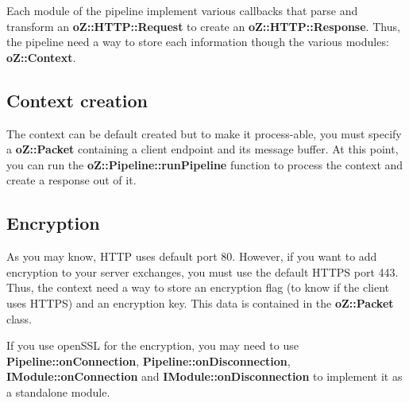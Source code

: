Each module of the pipeline implement various callbacks that parse and transform an {\bfseries{o\+Z\+::\+H\+T\+T\+P\+::\+Request}} to create an {\bfseries{o\+Z\+::\+H\+T\+T\+P\+::\+Response}}. Thus, the pipeline need a way to store each information though the various modules\+: {\bfseries{o\+Z\+::\+Context}}.

\subsection*{Context creation}

The context can be default created but to make it process-\/able, you must specify a {\bfseries{o\+Z\+::\+Packet}} containing a client endpoint and its message buffer. At this point, you can run the {\bfseries{o\+Z\+::\+Pipeline\+::run\+Pipeline}} function to process the context and create a response out of it. 
\begin{DoxyCode}{0}
\DoxyCodeLine{\{}
\DoxyCodeLine{}
\DoxyCodeLine{\}}
\end{DoxyCode}


\subsection*{Encryption}

As you may know, H\+T\+TP uses default port 80. However, if you want to add encryption to your server exchanges, you must use the default H\+T\+T\+PS port 443. Thus, the context need a way to store an encryption flag (to know if the client uses H\+T\+T\+PS) and an encryption key. This data is contained in the {\bfseries{o\+Z\+::\+Packet}} class.

If you use open\+S\+SL for the encryption, you may need to use {\bfseries{Pipeline\+::on\+Connection}}, {\bfseries{Pipeline\+::on\+Disconnection}}, {\bfseries{I\+Module\+::on\+Connection}} and {\bfseries{I\+Module\+::on\+Disconnection}} to implement it as a standalone module.


